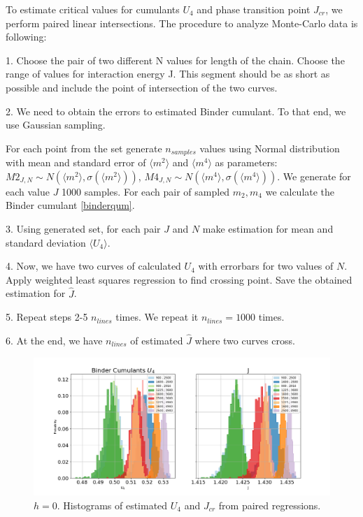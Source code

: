 To estimate critical values for cumulants $U_4$ and phase transition point $J_{cr}$, we perform paired linear intersections. The procedure to analyze Monte-Carlo data is following: 

1. Choose the pair of two different N values for length of the chain. Choose the range of values for interaction energy J. This segment should be as short as possible and include the point of intersection of the two curves. 

2. We need to obtain the errors to estimated Binder cumulant. To that end, we use Gaussian sampling. 

For each point from the set generate $n_{samples}$ values using Normal distribution with mean and standard error of $\langle m^2 \rangle  $ and $\langle m^4 \rangle$ as parameters: $ M2_{J, N} \sim N (\langle m^2 \rangle  , \sigma (\langle m^2 \rangle  ))$, $ M4_{J, N} \sim N (\langle m^4 \rangle  , \sigma (\langle m^4 \rangle  ))$. We generate for each value $J$ 1000 samples. For each pair of sampled $m_2, m_4$ we calculate the Binder cumulant \eqref{binderqum}. 

3. Using generated set, for each pair $J$ and $N$ make estimation for mean and standard deviation $\langle U_4 \rangle$.

4. Now, we have  two curves of calculated $U_4$ with errorbars for two values of $N$. Apply weighted least squares regression to find crossing point. Save the obtained estimation for $\hat{J}$. 

5. Repeat steps 2-5 $n_{lines}$ times. We repeat it $n_{lines}=1000$ times. 

6. At the end, we have $n_{lines}$ of estimated $\hat{J}$ where two curves cross. 
 
 \begin{figure}[!ht]
	\centering
	\includegraphics[scale=0.3628]{Images/bc_cov.png}
	\caption{$h=0$. Histograms of estimated $U_4$ and $J_{cr}$ from paired regressions.  }
	\label{fig:Jmagnethistogram}
\end{figure} 

